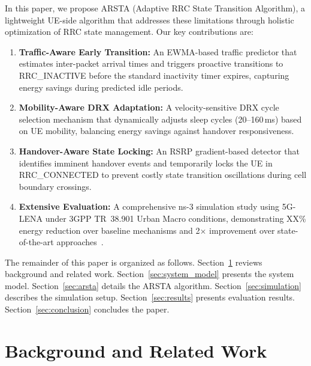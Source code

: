 \documentclass[conference]{IEEEtran}
\begin{document}
In this paper, we propose ARSTA (Adaptive RRC State Transition Algorithm), a lightweight UE-side algorithm that addresses these limitations through holistic optimization of RRC state management. Our key contributions are:
\begin{enumerate}
    \item \textbf{Traffic-Aware Early Transition:} An EWMA-based traffic predictor that estimates inter-packet arrival times and triggers proactive transitions to RRC\_INACTIVE before the standard inactivity timer expires, capturing energy savings during predicted idle periods.
    
    \item \textbf{Mobility-Aware DRX Adaptation:} A velocity-sensitive DRX cycle selection mechanism that dynamically adjusts sleep cycles (20--160\,ms) based on UE mobility, balancing energy savings against handover responsiveness.
    
    \item \textbf{Handover-Aware State Locking:} An RSRP gradient-based detector that identifies imminent handover events and temporarily locks the UE in RRC\_CONNECTED to prevent costly state transition oscillations during cell boundary crossings.
    
    \item \textbf{Extensive Evaluation:} A comprehensive ns-3 simulation study using 5G-LENA under 3GPP TR~38.901 Urban Macro conditions, demonstrating XX\% energy reduction over baseline mechanisms and 2$\times$ improvement over state-of-the-art approaches~\cite{Ding2024}.
\end{enumerate}

The remainder of this paper is organized as follows. Section~\ref{sec:background} reviews background and related work. Section~\ref{sec:system_model} presents the system model. Section~\ref{sec:arsta} details the ARSTA algorithm. Section~\ref{sec:simulation} describes the simulation setup. Section~\ref{sec:results} presents evaluation results. Section~\ref{sec:conclusion} concludes the paper.

\section{Background and Related Work}
\label{sec:background}
\end{document}
